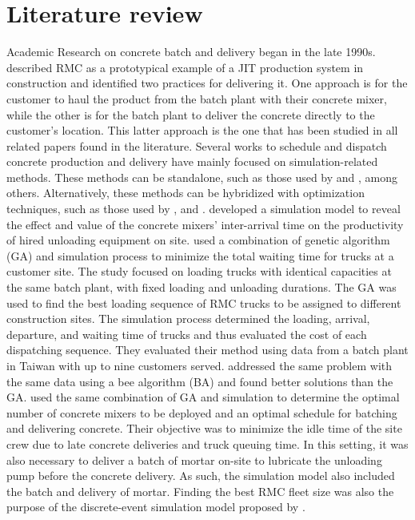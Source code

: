 \documentclass{article}
\begin{document}
\section{Literature review}
\label{lit_review}

Academic Research on concrete batch and delivery began in the late 1990s. \cite{tommelein1999just} described RMC as a prototypical example of a JIT production system in construction and identified two practices for delivering it. One approach is for the customer to haul the product from the batch plant with their concrete mixer, while the other is for the batch plant to deliver the concrete directly to the customer's location. This latter approach is the one that has been studied in all related papers found in the literature. Several works to schedule and dispatch concrete production and delivery have mainly focused on simulation-related methods. These methods can be standalone, such as those used by \cite{zayed2001simulation, wang2001scheduling, tian_simulation_based_2010, panas_simulation_based_2013} and \cite{galic2016simulation}, among others. Alternatively, these methods can be hybridized with optimization techniques, such as those used by \cite{feng2004optimizing, lu2005optimized}, and \cite{feng_integrating_2006}. \cite{wang2001scheduling} developed a simulation model to reveal the effect and value of the concrete mixers' inter-arrival time on the productivity of hired unloading equipment on site. \cite{feng2004optimizing} used a combination of genetic algorithm (GA) and simulation process to minimize the total waiting time for trucks at a customer site. The study focused on loading trucks with identical capacities at the same batch plant, with fixed loading and unloading durations. The GA was used to find the best loading sequence of RMC trucks to be assigned to different construction sites. The simulation process determined the loading, arrival, departure, and waiting time of trucks and thus evaluated the cost of each dispatching sequence. They evaluated their method using data from a batch plant in Taiwan with up to nine customers served. \cite{mayteekrieangkrai2015optimized} addressed the same problem with the same data using a bee algorithm (BA) and found better solutions than the GA. \cite{lu2005optimized} used the same combination of GA and simulation to determine the optimal number of concrete mixers to be deployed and an optimal schedule for batching and delivering concrete. Their objective was to minimize the idle time of the site crew due to late concrete deliveries and truck queuing time. In this setting, it was also necessary to deliver a batch of mortar on-site to lubricate the unloading pump before the concrete delivery. As such, the simulation model also included the batch and delivery of mortar. Finding the best RMC fleet size was also the purpose of the discrete-event simulation model proposed by \cite{panas_simulation_based_2013}.
\end{document}
